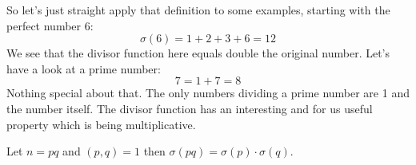 \documentclass{article}
\theoremstyle{definition}
\begin{document}
So let's just straight apply that definition to some examples, starting with the perfect number 6:
\begin{equation}
    \sigma (6) = 1 + 2 + 3 + 6 = 12
\end{equation}
We see that the divisor function here equals double the original number. Let's have a look at a prime number:
\begin{equation}
    7 = 1 + 7 = 8
\end{equation}
Nothing special about that. The only numbers dividing a prime number are 1 and the number itself. 
The divisor function has an interesting and for us useful property which is being multiplicative. 
\begin{theorem}
    Let $n=pq$ and $(p,q)=1$ then $\sigma(pq) = \sigma(p) \cdot \sigma(q)$.
\end{theorem}
\end{document}
